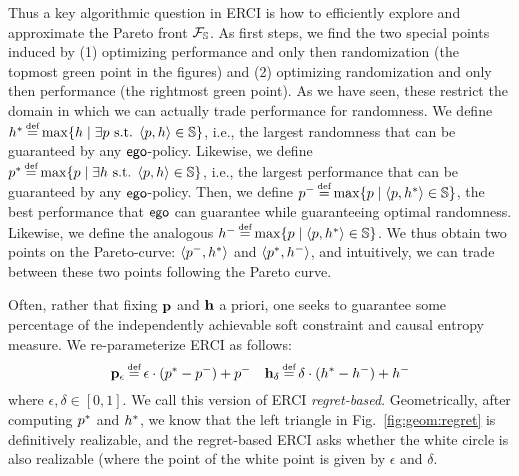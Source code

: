 Thus a key algorithmic question in ERCI is how to efficiently explore
and approximate the Pareto front $\mathcal{F}_{\mathbb{S}}$. As first steps, we find the two special points induced by (1) optimizing performance and only then randomization (the topmost green point in the figures) and (2) optimizing randomization and only then performance (the rightmost green point). 
As we have seen, these restrict the domain in which we can actually trade performance for randomness. 
We define 
$\rndopt \eqdef \max \{ \rndp \mid \exists \scp \text{ s.t. } \langle \scp, \rndp \rangle \in \solutions  \} $, i.e., the largest randomness that can be guaranteed by any $\mathsf{ego}$-policy. 
Likewise, we define 
$\scopt \eqdef \max \{ \scp \mid \exists \rndp \text{ s.t. } \langle \scp, \rndp \rangle \in \solutions  \} $, i.e., the largest performance that can be guaranteed by any $\mathsf{ego}$-policy. 
Then, we define 
$\scmin \eqdef \max \{ \scp \mid \langle \scp, \rndopt \rangle  \in \solutions \}$, the best performance that $\mathsf{ego}$ can guarantee while guaranteeing optimal randomness. 
Likewise, we define  the analogous $\rndmin \eqdef \max \{ \scp \mid \langle \scp, \rndopt \rangle  \in \solutions \}$.
We thus obtain two points on the Pareto-curve: $\langle p^{-}, h^{*} \rangle$ and $\langle p^{*}, h^{-} \rangle$, and intuitively, we can trade between these two points following the Pareto curve.


Often, rather that fixing $\mathbf{p}$ and $\mathbf{h}$ a
  priori, one seeks to guarantee some percentage of the independently achievable soft
  constraint and causal entropy measure.  We
  re-parameterize ERCI as follows:
  \begin{equation}
    \scthreshold_\epsilon \eqdef \epsilon \cdot (\scopt - \scmin) + \scmin
    \hspace{1em}
    \randomness_\delta \eqdef  \delta \cdot (\rndopt - \rndmin) + \rndmin
  \end{equation}
  where $\epsilon, \delta \in [0, 1]$. We call this version of ERCI \emph{regret-based}. Geometrically, after computing $p^{*}$ and $h^{*}$, we know that the left triangle in Fig.~\ref{fig:geom:regret} is definitively realizable, and the regret-based ERCI asks whether the white circle is also realizable (where the point of the white point is given by $\epsilon$ and $\delta$. %

